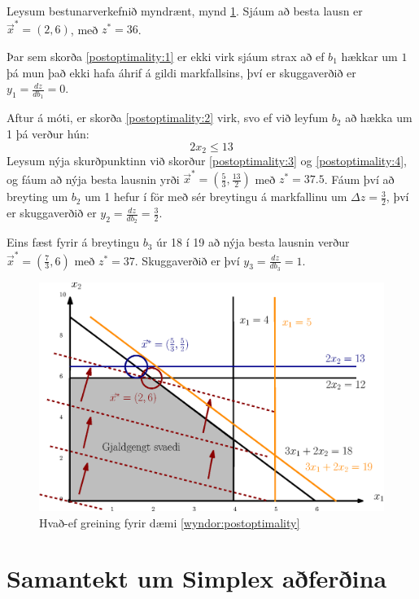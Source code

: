\begin{lausn}
Leysum bestunarverkefnið myndrænt, mynd \ref{wyndor:img:postoptimality}. Sjáum að besta lausn er $\vec{x}^*=(2,6)$, með $z^*=36$.

Þar sem skorða \eqref{postoptimality:1} er ekki virk sjáum strax að ef $b_1$ hækkar um $1$ þá mun það ekki hafa áhrif á gildi markfallsins, því er skuggaverðið er $y_1=\frac{dz}{db_1}=0$.

Aftur á móti, er skorða \eqref{postoptimality:2} virk, svo ef við leyfum $b_2$ að hækka um 1 þá verður hún:
\begin{equation} 2x_2 \leq 13 \label{postoptimality:4}\end{equation}
Leysum nýja skurðpunktinn við skorður \eqref{postoptimality:3} og \eqref{postoptimality:4}, og fáum að nýja besta lausnin yrði $\vec{x}^*=(\frac{5}{3},\frac{13}{2})$ með $z^*=37.5$. Fáum því að breyting um $b_2$ um 1 hefur í för með sér breytingu á markfallinu um $\Delta z=\frac{3}{2}$, því er skuggaverðið er $y_2=\frac{dz}{db_2}=\frac{3}{2}$.

Eins fæst fyrir á breytingu $b_3$ úr 18 í 19 að nýja besta lausnin verður $\vec{x}^*=(\frac{7}{3},6)$ með $z^*=37$. Skuggaverðið er því $y_3=\frac{dz}{db_3}=1$.

\begin{figure}[h!]
\centering
\includegraphics[width=0.8\columnwidth]{figs/wyndor_postoptimality.eps}
\caption{Hvað-ef greining fyrir dæmi \ref{wyndor:postoptimality}}\label{wyndor:img:postoptimality}
\end{figure}
\end{lausn}

\newpage
\section{Samantekt um Simplex aðferðina}
 
